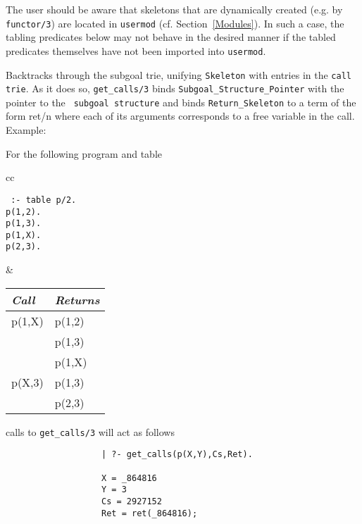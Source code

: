 The user should be aware that skeletons that are dynamically created
(e.g. by {\tt functor/3}) are located in {\tt usermod}
(cf. Section~\ref{Modules}).  In such a case, the tabling predicates
below may not behave in the desired manner if the tabled predicates
themselves have not been imported into {\tt usermod}.

\begin{description}

Backtracks through the subgoal trie, unifying {\tt Skeleton} with
entries in the {\tt call trie}.  As it does so, {\tt get\_calls/3}
binds {\tt Subgoal\_Structure\_Pointer} with the pointer to the {\tt
subgoal structure} and binds {\tt Return\_Skeleton} to a term of the
form ret/n where each of its arguments corresponds to a free variable
in the call.  Example:

For the following program and table
     \begin{center}
     \begin{tabular}{cc}
     \begin{minipage}{1.1in}
     {\tt
          :- table p/2.	\\
          p(1,2).       \\
          p(1,3).       \\
          p(1,X).       \\
          p(2,3). 
     }
     \end{minipage}
     &
     \begin{tabular}{||l|l||}   \hline
     {\em Call}			& {\em Returns} \\ \hline \hline
     p(1,X)			& p(1,2) \\ 
 	       			& p(1,3) \\
                                & p(1,X) \\ \hline
     p(X,3)			& p(1,3) \\ 
 	       			& p(2,3) \\ \hline
     \end{tabular}
     \end{tabular}
     \end{center}
calls to {\tt get\_calls/3} will act as follows
	{\footnotesize
	\begin{verbatim}
                   | ?- get_calls(p(X,Y),Cs,Ret).

                   X = _864816
                   Y = 3
                   Cs = 2927152
                   Ret = ret(_864816);


\end{verbatim}}
\end{description}
